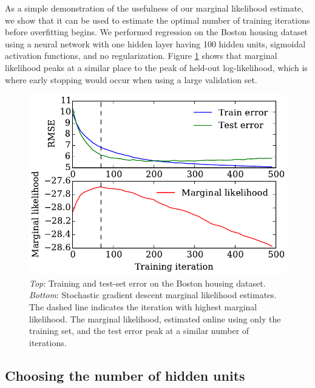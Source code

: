 \documentclass[]{article}
\begin{document}
As a simple demonstration of the usefulness of our marginal likelihood estimate, we show that it can be used to estimate the optimal number of training iterations before overfitting begins.
We performed regression on the Boston housing dataset 
using a neural network with one hidden layer having 100 hidden units, sigmoidal activation functions, and no regularization.
Figure \ref{fig:housing} shows that marginal likelihood peaks at a similar place to the peak of held-out log-likelihood, which is where early stopping would occur when using a large validation set.

\begin{figure}[h!]
\begin{center}
\includegraphics[width=\columnwidth]{../experiments/2015_03_01_housing/2/marglik.pdf}
\vskip -0.1in
\caption{\emph{Top}: Training and test-set error on the Boston housing dataset.
\emph{Bottom}: Stochastic gradient descent marginal likelihood estimates.
The dashed line indicates the iteration with highest marginal likelihood.
The marginal likelihood, estimated online using only the training set, and the
test error peak at a similar number of iterations.}
\label{fig:housing}
\end{center}
\end{figure}



\subsection{Choosing the number of hidden units}
\end{document}
